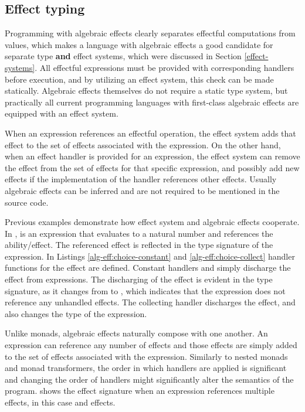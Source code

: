 


\subsection{Effect typing}
Programming with algebraic effects clearly separates effectful computations from values, which makes a language with algebraic effects a good candidate for separate type \textbf{and} effect systems, which were discussed in Section \ref{effect-systems}. All effectful expressions must be provided with corresponding handlers before execution, and by utilizing an effect system, this check can be made statically. Algebraic effects themselves do not require a static type system, but practically all current programming languages with first-class algebraic effects are equipped with an effect system.

When an expression references an effectful operation, the effect system adds that effect to the set of effects associated with the expression. On the other hand, when an effect handler is provided for an expression, the effect system can remove the effect from the set of effects for that specific expression, and possibly add new effects if the implementation of the handler references other effects. Usually algebraic effects can be inferred and are not required to be mentioned in the source code.

Previous examples demonstrate how effect system and algebraic effects cooperate. In ,  is an expression that evaluates to a natural number and references the  ability/effect. The referenced effect is reflected in the type signature of the expression. In Listings \ref{alg-eff:choice-constant} and \ref{alg-eff:choice-collect} handler functions for the  effect are defined. Constant handlers  and  simply discharge the effect from expressions. The discharging of the effect is evident in the type signature, as it changes from  to , which indicates that the expression does not reference any unhandled effects. The collecting handler  discharges the effect, and also changes the type of the expression.

Unlike monads, algebraic effects naturally compose with one another. An expression can reference any number of effects and those effects are simply added to the set of effects associated with the expression. Similarly to nested monads and monad transformers, the order in which handlers are applied is significant and changing the order of handlers might significantly alter the semantics of the program.  shows the effect signature when an expression references multiple effects, in this case  and  effects.


